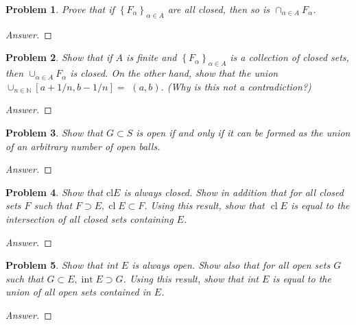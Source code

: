\documentclass{article}
\newtheorem{problem}{Problem}[section]
\begin{document}
\begin{problem}
Prove that if $\left\{F_{\alpha}\right\}_{\alpha \in A}$ are all closed, then so is $\cap_{\alpha \in A} F_{\alpha}$.
\end{problem}

\begin{proof}[Answer]
    
\end{proof}

\begin{problem}
Show that if $A$ is finite and $\left\{F_{\alpha}\right\}_{\alpha \in A}$ is a collection of closed sets, then $\cup_{\alpha \in A} F_{\alpha}$ is closed. On the other hand, show that the union $\cup_{n \in \mathbb{N}}[a+1 / n, b-1 / n]=$ $(a, b)$. (Why is this not a contradiction?)
\end{problem}

\begin{proof}[Answer]
    
\end{proof}

\begin{problem}
Show that $G \subset S$ is open if and only if it can be formed as the union of an arbitrary number of open balls.
\end{problem}

\begin{proof}[Answer]
    
\end{proof}

\begin{problem}
Show that $\mathrm{cl} E$ is always closed. Show in addition that for all closed sets $F$ such that $F \supset E, \operatorname{cl} E \subset F$. Using this result, show that $\operatorname{cl} E$ is equal to the intersection of all closed sets containing $E$.
\end{problem}

\begin{proof}[Answer]
    
\end{proof}

\begin{problem}
Show that int $E$ is always open. Show also that for all open sets $G$ such that $G \subset E, \operatorname{int} E \supset G$. Using this result, show that int $E$ is equal to the union of all open sets contained in $E$.
\end{problem}

\begin{proof}[Answer]
    
\end{proof}
\end{document}
